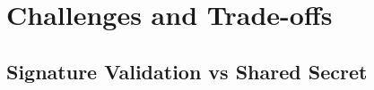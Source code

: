 \documentclass{sig-alternate}
\renewcommand\_{\textunderscore\allowbreak}  %
\begin{document}
\section{Challenges and Trade-offs}

\subsection{Signature Validation vs Shared Secret}


%
%
%
\end{document}
